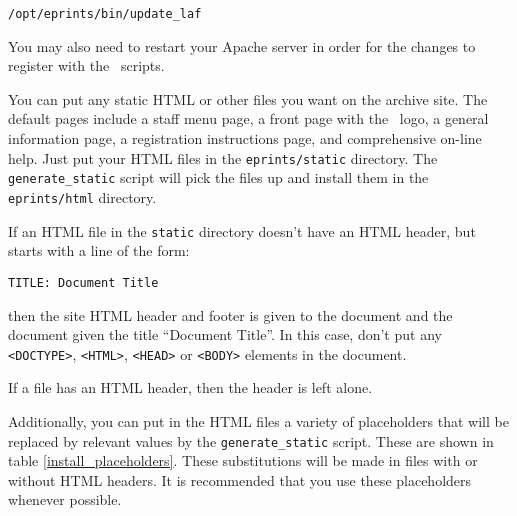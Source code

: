 \begin{verbatim}
/opt/eprints/bin/update_laf
\end{verbatim}

You may also need to restart your Apache server in order for the changes to register with the \eprints\ scripts.

You can put any static HTML or other files you want on the archive site. The default pages include a staff menu page, a front page with the \eprints\ logo, a general information page, a registration instructions page, and comprehensive on-line help. Just put your HTML files in the {\tt eprints/static} directory. The {\tt generate\_static} script will pick the files up and install them in the {\tt eprints/html} directory.

If an HTML file in the {\tt static} directory doesn't have an HTML header, but starts with a line of the form:

\begin{verbatim}
TITLE: Document Title
\end{verbatim}

then the site HTML header and footer is given to the document and the document given the title ``Document Title''. In this case, don't put any {\tt <DOCTYPE>}, {\tt <HTML>}, {\tt <HEAD>} or {\tt <BODY>} elements in the document.

If a file has an HTML header, then the header is left alone.

Additionally, you can put in the HTML files a variety of placeholders that will be replaced by relevant values by the {\tt generate\_static} script. These are shown in table \ref{install_placeholders}. These substitutions will be made in files with or without HTML headers. It is recommended that you use these placeholders whenever possible.

